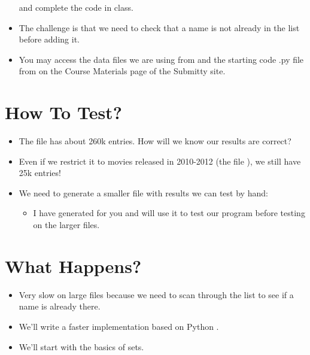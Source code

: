 \documentclass[letterpaper,10pt,english]{sphinxmanual}
\begin{document}
\begin{itemize}
and complete the code in class.

\item {} 
The challenge is that we need to check that a name is not already in
the list before adding it.

\item {} 
You may access the data files we are using from and the starting code .py file from
 on the Course Materials page of the Submitty site.

\end{itemize}


\section{How To Test?}
\label{\detokenize{lecture_notes/lec15_sets:how-to-test}}\begin{itemize}
\item {} 
The file  has about 260k entries. How will we know
our results are correct?

\item {} 
Even if we restrict it to movies released in 2010-2012 (the file
), we still have 25k entries!

\item {} 
We need to generate a smaller file with results we can test by hand:
\begin{itemize}
\item {} 
I have generated  for you and will use it to test our
program before testing on the larger files.

\end{itemize}

\end{itemize}


\section{What Happens?}
\label{\detokenize{lecture_notes/lec15_sets:what-happens}}\begin{itemize}
\item {} 
Very slow on large files because we need to scan through the list
to see if a name is already there.

\item {} 
We’ll write a faster implementation based on Python .

\item {} 
We’ll start with the basics of sets.

\end{itemize}
\end{document}
